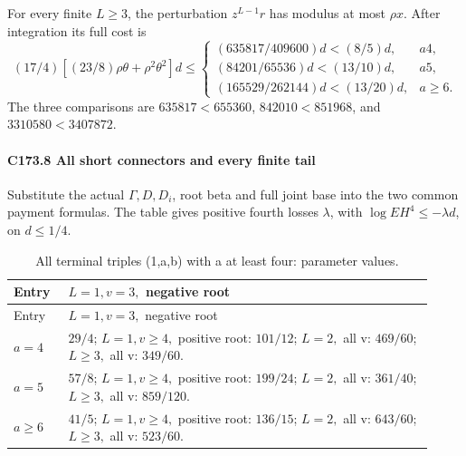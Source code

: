 For every finite \(L\ge3\), the perturbation \(z^{L-1}r\) has modulus at most \(\rho x\). After integration its full cost is
\[
(17/4)[(23/8)\rho\theta+\rho^2\theta^2]d
\le\begin{cases}
(635817/409600)d<(8/5)d,&a4,\\
(84201/65536)d<(13/10)d,&a5,\\
(165529/262144)d<(13/20)d,&a\ge6.
\end{cases}                                        \tag{C173.T183.32}
\]
The three comparisons are \(635817<655360\), \(842010<851968\), and \(3310580<3407872\).

\paragraph{C173.8 All short connectors and every finite tail}

Substitute the actual \(\Gamma,\allowbreak \allowbreak  D,\allowbreak \allowbreak  D_i\), root beta and full joint base into the two common payment formulas. The table gives positive fourth losses \(\lambda\), with \(\log EH^4\le-\lambda d\), on \(d\le1/4\).


\begingroup\small
\setlength{\tabcolsep}{3pt}
\setlength{\LTleft}{0pt}\setlength{\LTright}{\fill}
\begin{longtable}{@{}p{0.1200\linewidth}p{0.8000\linewidth}@{}}
\caption{All terminal triples (1,a,b) with a at least four: parameter values.}\label{tab:parameters:q5-c173:1}\\
\toprule
Entry & \(L=1,\allowbreak  v=3,\allowbreak \) negative root \\
\midrule\endfirsthead
\toprule
Entry & \(L=1,\allowbreak  v=3,\allowbreak \) negative root \\
\midrule\endhead
\bottomrule\endfoot
\(a=4\) & \(29/4\); \(L=1,\allowbreak  v\ge 4,\allowbreak \) positive root: \(101/12\); \(L=2,\allowbreak \) all v: \(469/60\); \(L\ge 3,\allowbreak \) all v: \(349/60\). \\
\addlinespace[2pt]
\(a=5\) & \(57/8\); \(L=1,\allowbreak  v\ge 4,\allowbreak \) positive root: \(199/24\); \(L=2,\allowbreak \) all v: \(361/40\); \(L\ge 3,\allowbreak \) all v: \(859/120\). \\
\addlinespace[2pt]
\(a\ge 6\) & \(41/5\); \(L=1,\allowbreak  v\ge 4,\allowbreak \) positive root: \(136/15\); \(L=2,\allowbreak \) all v: \(643/60\); \(L\ge 3,\allowbreak \) all v: \(523/60\). \\
\end{longtable}
\endgroup


